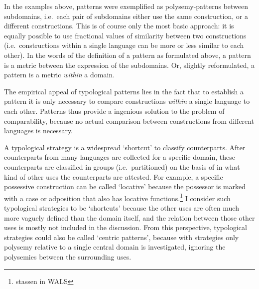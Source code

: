 In the examples above, patterns were exemplified as polysemy-patterns between subdomains, i.e.~each pair of subdomains either use the same construction, or a different constructions. This is of course only the most basic approach: it is equally possible to use fractional values of similarity between two constructions (i.e.~constructions within a single language can be more or less similar to each other). In the words of the definition of a pattern as formulated above, a pattern is a metric between the expression of the subdomains. Or, slightly reformulated, a pattern is a metric \emph{within} a domain.

The empirical appeal of typological patterns lies in the fact that to establish a pattern it is only necessary to compare constructions \emph{within} a single language to each other. Patterns thus provide a ingenious solution to the problem of comparability, because no actual comparison between constructions from different languages is necessary.

%
A typological strategy is a widespread `shortcut' to classify counterparts. After counterparts from many languages are collected for a specific domain, these counterparts are classified in groups (i.e.~partitioned) on the basis of in what kind of other uses the counterparts are attested. For example, a specific possessive construction can be called `locative' because the possessor is marked with a case or adposition that also has locative functions.\footnote{stassen in WALS} I consider such typological strategies to be `shortcuts' because the other uses are often much more vaguely defined than the domain itself, and the relation between those other uses is mostly not included in the discussion. From this perspective, typological strategies could also be called `centric patterns', because with strategies only polysemy relative to a single central domain is investigated, ignoring the polysemies between the surrounding uses. 
